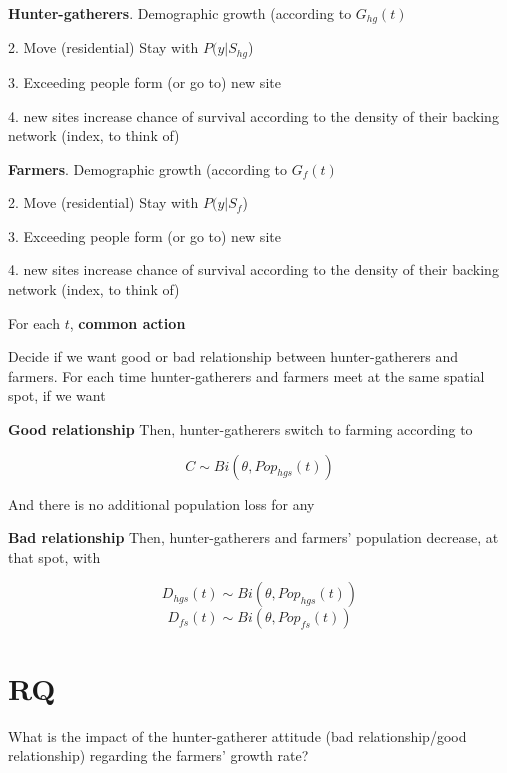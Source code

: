 \documentclass{article}
\begin{document}
\begin{algorithm}[h]
  \begin{multicols}{2}
    \begin{algorithmic}
      \scriptsize
      \begin{flushleft}
      \textbf{Hunter-gatherers}. Demographic growth (according to $G_{hg}(t)$\break
      
      2. Move (residential)  Stay with $P(y|S_{hg}$) \break
      
      3.
        \STATE Exceeding people form (or go to) new site
        \ENDIF \break
      
      4. new sites increase chance of survival according to the density of their backing network (index, to think of)
        
      
      \end{flushleft}
    \end{algorithmic}
    \columnbreak
    \begin{algorithmic}
      \scriptsize
      \begin{flushleft}
      \textbf{Farmers}. Demographic growth (according to $G_{f}(t)$\break
      
      2. Move (residential)  Stay with $P(y|S_{f}$) \break
      
      3.
        \STATE Exceeding people form (or go to) new site
        \ENDIF \break
      
      4. new sites increase chance of survival according to the density of their backing network (index, to think of)
        
      \end{flushleft}
    \end{algorithmic}
  \end{multicols}
\end{algorithm}

\noindent For each $t$, \textbf{common action}

Decide if we want good or bad relationship between hunter-gatherers and farmers. For each time hunter-gatherers and farmers meet at the same spatial spot, if we want

\textbf{Good relationship}
Then, hunter-gatherers switch to farming according to

$$C \sim Bi(\theta, Pop_{hgs}(t))$$

And there is no additional population loss for any

\textbf{Bad relationship}
Then, hunter-gatherers and farmers' population decrease, at that spot, with

$$D_{hgs}(t) \sim Bi(\theta,Pop_{hgs}(t))$$
$$D_{fs}(t) \sim Bi(\theta,Pop_{fs}(t))$$

\section{RQ}

What is the impact of the hunter-gatherer attitude (bad relationship/good relationship) regarding the farmers' growth rate?
\end{document}
